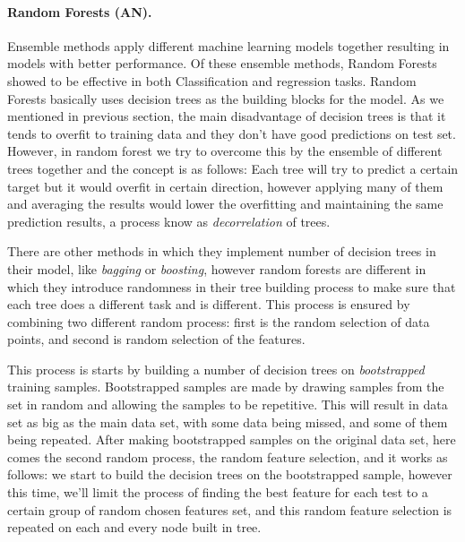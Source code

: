 \documentclass[12pt, a4paper]{scrartcl}
\begin{document}
\paragraph{Random Forests (AN).} Ensemble methods apply different machine learning models together resulting in models with better performance. Of these ensemble methods, Random Forests showed to be effective in both Classification and regression tasks. Random Forests basically uses decision trees as the building blocks for the model. As we mentioned in previous section, the main disadvantage of decision trees is that it tends to overfit to training data and they don't have good predictions on test set. However, in random forest we try to overcome this by the ensemble of different trees together and the concept is as follows: Each tree will try to predict a certain target but it would overfit in certain direction, however applying many of them and averaging the results would lower the overfitting and maintaining the same prediction results, a process know as \emph{decorrelation} of trees. 

There are other methods in which they implement number of decision trees in their model, like \emph{bagging} or \emph{boosting}, however random forests are different in which they introduce randomness in their tree building process to make sure that each tree does a different task and is different. This process is ensured by combining two different random process: first is the random selection of data points, and second is random selection of the features.

This process is starts by building a number of decision trees on \emph{bootstrapped} training samples. Bootstrapped samples are made by drawing samples from the set in random and allowing the samples to be repetitive. This will result in data set as big as the main data set, with some data being missed, and some of them being repeated. After making bootstrapped samples on the original data set, here comes the second random process, the random feature selection, and it works as follows: we start to build the decision trees on the bootstrapped sample, however this time, we'll limit the process of finding the best feature for each test to a certain group of random chosen features set, and this random feature selection is repeated on each and every node built in tree. 
\end{document}
